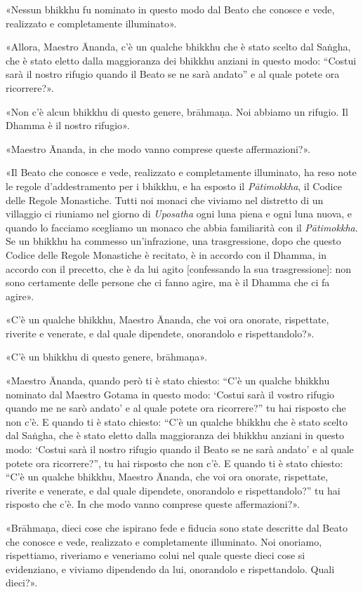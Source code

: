 «Nessun bhikkhu fu nominato in questo modo dal Beato che conosce e vede,
realizzato e completamente illuminato».

«Allora, Maestro Ānanda, c’è un qualche bhikkhu che è stato scelto dal Saṅgha,
che è stato eletto dalla maggioranza dei bhikkhu anziani in questo modo: “Costui
sarà il nostro rifugio quando il Beato se ne sarà andato” e al quale potete ora
ricorrere?».

«Non c’è alcun bhikkhu di questo genere, brāhmaṇa. Noi abbiamo un rifugio. Il
Dhamma è il nostro rifugio».

«Maestro Ānanda, in che modo vanno comprese queste affermazioni?».

«Il Beato che conosce e vede, realizzato e completamente illuminato, ha reso
note le regole d’addestramento per i bhikkhu, e ha esposto il \emph{Pātimokkha},
il Codice delle Regole Monastiche. Tutti noi monaci che viviamo nel distretto di
un villaggio ci riuniamo nel giorno di \emph{Uposatha} ogni luna piena e ogni
luna nuova, e quando lo facciamo scegliamo un monaco che abbia familiarità con
il \emph{Pātimokkha}. Se un bhikkhu ha commesso un’infrazione, una
trasgressione, dopo che questo Codice delle Regole Monastiche è recitato, è in
accordo con il Dhamma, in accordo con il precetto, che è da lui agito
[confessando la sua trasgressione]: non sono certamente delle persone che ci
fanno agire, ma è il Dhamma che ci fa agire».

«C’è un qualche bhikkhu, Maestro Ānanda, che voi ora onorate, rispettate,
riverite e venerate, e dal quale dipendete, onorandolo e rispettandolo?».

«C’è un bhikkhu di questo genere, brāhmaṇa».

«Maestro Ānanda, quando però ti è stato chiesto: “C’è un qualche bhikkhu
nominato dal Maestro Gotama in questo modo: ‘Costui sarà il vostro rifugio
quando me ne sarò andato’ e al quale potete ora ricorrere?” tu hai risposto che
non c’è. E quando ti è stato chiesto: “C’è un qualche bhikkhu che è stato scelto
dal Saṅgha, che è stato eletto dalla maggioranza dei bhikkhu anziani in questo
modo: ‘Costui sarà il nostro rifugio quando il Beato se ne sarà andato’ e al
quale potete ora ricorrere?”, tu hai risposto che non c’è. E quando ti è stato
chiesto: “C’è un qualche bhikkhu, Maestro Ānanda, che voi ora onorate,
rispettate, riverite e venerate, e dal quale dipendete, onorandolo e
rispettandolo?” tu hai risposto che c’è. In che modo vanno comprese queste
affermazioni?».

«Brāhmaṇa, dieci cose che ispirano fede e fiducia sono state descritte dal Beato
che conosce e vede, realizzato e completamente illuminato. Noi onoriamo,
rispettiamo, riveriamo e veneriamo colui nel quale queste dieci cose si
evidenziano, e viviamo dipendendo da lui, onorandolo e rispettandolo. Quali
dieci?».

